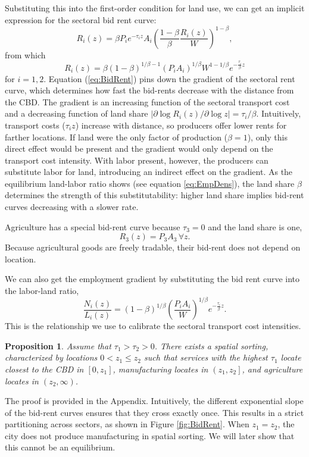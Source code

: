 \documentclass[12pt]{article}
\newtheorem{proposition}{Proposition}
\begin{document}
Substituting this into the first-order condition for land use, we can get an implicit expression for the sectoral bid rent curve:
\[
R_i(z) =\beta P_ie^{-\tau_i z}A_i \left(\frac{1-\beta}{\beta}\frac{R_i(z)}{W}\right)^{1-\beta},
\]
from which
\begin{equation}
\label{eq:BidRent}
R_i(z) =\beta(1-\beta)^{1/\beta-1} (P_iA_i)^{1/\beta} W^{1-1/\beta} e^{-\frac{\tau_i}{\beta} z}
\end{equation}
for $i=1,2$. Equation (\ref{eq:BidRent}) pins down the gradient of the sectoral rent curve, which determines how fast the bid-rents decrease with the distance from the CBD. The gradient is an increasing function of the sectoral transport cost and a decreasing function of land share $|\partial\log R_i(z)/\partial \log z|=\tau_i/\beta$. Intuitively, transport costs ($\tau_iz$) increase with distance, so producers offer lower rents for farther locations. If land were the only factor of production ($\beta=1$), only this direct effect would be present and the gradient would only depend on the transport cost intensity. With labor present, however, the producers can substitute labor for land, introducing an indirect effect on the gradient. As the equilibrium land-labor ratio shows (see equation \ref{eq:EmpDens}), the land share $\beta$ determines the strength of this substitutability: higher land share implies bid-rent curves decreasing with a slower rate.

Agriculture has a special bid-rent curve because $\tau_3=0$ and the land share is one,
\begin{equation}
\label{eq:BidRent:agri}
R_3(z) =P_3A_3 \, \forall z.
\end{equation}
Because agricultural goods are freely tradable, their bid-rent does not depend on location.

We can also get the employment gradient by substituting the bid rent curve into the labor-land ratio,
\begin{equation}
\label{eq:EmpGrad}
\frac{N_i(z)}{L_i(z)} = (1-\beta)^{1/\beta} \left(\frac{P_iA_i}{W}\right)^{1/\beta} e^{-\frac{\tau_i}{\beta} z}.
\end{equation}
This is the relationship we use to calibrate the sectoral transport cost intensities.

\begin{proposition}\label{prop:existence}
Assume that $\tau_1>\tau_2>0$. There exists a spatial sorting, characterized by locations $0<z_1\le z_2$ such that services with the highest $\tau_1$ locate closest to the CBD in $\left[0,z_1\right]$, manufacturing locates in $\left(z_1,z_2\right]$, and agriculture locates in $(z_2,\infty)$.
\end{proposition}
The proof is provided in the Appendix. Intuitively, the different exponential slope of the bid-rent curves ensures that they cross exactly once. This results in a strict partitioning across sectors, as shown in Figure \ref{fig:BidRent}. When $z_1=z_2$, the city does not produce manufacturing in spatial sorting. We will later show that this cannot be an equilibrium. 
\end{document}
